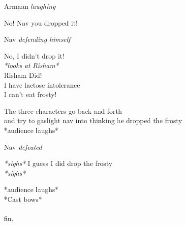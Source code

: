 \documentclass[12pt]{article}
\begin{document}
Armaan
\textit{  laughing}
\begin{center}
    No! Nav you dropped it!
\end{center}

Nav
\textit{  defending himself}
\begin{center}
    No, I didn't drop it!\\
    \textit{*looks at Risham*}\\
    Risham Did!\\
    I have lactose intolerance\\I can't eat frosty!\\
\end{center}

\begin{center}
    The three characters go back and forth\\and try to gaslight nav into thinking he dropped the frosty\\*audience laughs*\\
\end{center}

Nav
\textit{  defeated}
\begin{center}
    \textit{*sighs*} 
    I guess I did drop the frosty\\
    \textit{*sighs*}
\end{center}

\begin{center}
    *audience laughs*\\*Cast bows*\\~\\fin.
\end{center}

\end{document}
